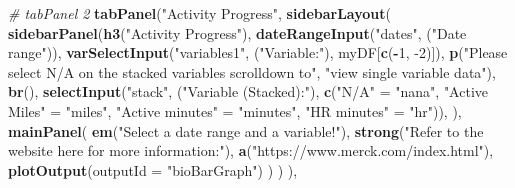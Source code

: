 \documentclass[]{book}
\newenvironment{Shaded}{\begin{snugshade}}{\end{snugshade}}
\newcommand{\KeywordTok}[1]{\textcolor[rgb]{0.13,0.29,0.53}{\textbf{#1}}}
\newcommand{\DataTypeTok}[1]{\textcolor[rgb]{0.13,0.29,0.53}{#1}}
\newcommand{\DecValTok}[1]{\textcolor[rgb]{0.00,0.00,0.81}{#1}}
\newcommand{\StringTok}[1]{\textcolor[rgb]{0.31,0.60,0.02}{#1}}
\newcommand{\CommentTok}[1]{\textcolor[rgb]{0.56,0.35,0.01}{\textit{#1}}}
\newcommand{\OperatorTok}[1]{\textcolor[rgb]{0.81,0.36,0.00}{\textbf{#1}}}
\newcommand{\NormalTok}[1]{#1}
\begin{document}
\begin{Shaded}
\begin{Highlighting}[]
{{                         \CommentTok{# tabPanel 2}
                         \KeywordTok{tabPanel}\NormalTok{(}\StringTok{"Activity Progress"}\NormalTok{,}
                                  \KeywordTok{sidebarLayout}\NormalTok{(}
                                    \KeywordTok{sidebarPanel}\NormalTok{(}\KeywordTok{h3}\NormalTok{(}\StringTok{"Activity Progress"}\NormalTok{),}
                                                 \KeywordTok{dateRangeInput}\NormalTok{(}\StringTok{"dates"}\NormalTok{, (}\StringTok{"Date range"}\NormalTok{)),}
                                                 \KeywordTok{varSelectInput}\NormalTok{(}\StringTok{"variables1"}\NormalTok{, (}\StringTok{"Variable:"}\NormalTok{), myDF[}\KeywordTok{c}\NormalTok{(}\OperatorTok{-}\DecValTok{1}\NormalTok{, }\DecValTok{-2}\NormalTok{)]),}
                                                 \KeywordTok{p}\NormalTok{(}\StringTok{"Please select N/A on the stacked variables scrolldown to"}\NormalTok{,}
                                                   \StringTok{"view single variable data"}\NormalTok{), }\KeywordTok{br}\NormalTok{(),}
                                                 \KeywordTok{selectInput}\NormalTok{(}\StringTok{"stack"}\NormalTok{, (}\StringTok{"Variable (Stacked):"}\NormalTok{),}
                                                             \KeywordTok{c}\NormalTok{(}\StringTok{"N/A"}\NormalTok{ =}\StringTok{ "nana"}\NormalTok{, }\StringTok{"Active Miles"}\NormalTok{ =}\StringTok{ "miles"}\NormalTok{, }\StringTok{"Active minutes"}\NormalTok{ =}\StringTok{ "minutes"}\NormalTok{, }\StringTok{"HR minutes"}\NormalTok{ =}\StringTok{ "hr"}\NormalTok{)),}
\NormalTok{                                    ),}
                                    \KeywordTok{mainPanel}\NormalTok{(}
                                      \KeywordTok{em}\NormalTok{(}\StringTok{"Select a date range and a variable!"}\NormalTok{),}
                                      \KeywordTok{strong}\NormalTok{(}\StringTok{"Refer to the website here for more information:"}\NormalTok{),}
                                      \KeywordTok{a}\NormalTok{(}\StringTok{"https://www.merck.com/index.html"}\NormalTok{),}
                                      \KeywordTok{plotOutput}\NormalTok{(}\DataTypeTok{outputId =} \StringTok{"bioBarGraph"}\NormalTok{)}
\NormalTok{                                    )}
\NormalTok{                                  )}
\NormalTok{                         ),}
                         
}}
\end{Highlighting}
\end{Shaded}
\end{document}
